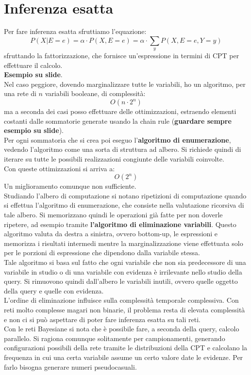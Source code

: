 \message{ !name(modprob.tex)}\documentclass[a4paper,12pt, oneside]{book}
\begin{document}
\section{Inferenza esatta}
Per fare inferenza esatta sfruttiamo l'equazione:
\[P(X|E=e)=\alpha\cdot P(X,E=e)=\alpha\cdot \sum_y P(X,E=e, Y=y)\]
sfruttando la fattorizzazione, che fornisce un'espressione in termini di CPT per
effettuare il calcolo.\\
\textbf{Esempio su slide}.\\
Nel caso peggiore, dovendo marginalizzare tutte le variabili, ho un algoritmo,
per una rete di $n$ variabili booleane, di complessità:
\[O(n\cdot 2^n)\]
ma a seconda dei casi posso effettuare delle ottimizzazioni, estraendo elementi
costanti dalle sommatorie generate usando la chain rule (\textbf{guardare sempre
  esempio su slide}).\\
Per ogni sommatoria che si crea poi eseguo l'\textbf{algoritmo di enumerazione},
vedendo l'algoritmo come una sorta di struttura ad albero. Si richiede quindi di
iterare su tutte le possibili realizzazioni congiunte delle variabili
coinvolte. \\
Con queste ottimizzazioni si arriva a:
\[O(2^n)\]
Un miglioramento comunque non sufficiente.\\
Studiando l'albero di computazione si notano ripetizioni di computazione quando
si effettua l'algoritmo di enumerazione, che consiste nella valutazione
ricorsiva di tale albero. Si memorizzano quindi le operazioni già fatte per non
doverle ripetere, ad esempio tramite \textbf{l'algoritmo di eliminazione
  variabili}. Questo algoritmo valuta da destra a sinistra, ovvero bottom-up, le
espressioni e memorizza i risultati intermedi mentre la marginalizzazione viene
effettuata solo per le porzioni di espressione che dipendono dalla variabile
stessa. \\
Tale algoritmo si basa sul fatto che ogni variabile che non sia predecessore di
una variabile in studio o di una variabile con evidenza è irrilevante nello
studio 
della query. Si rimuovono quindi dall'albero le variabili inutili, ovvero quelle
oggetto della query e quelle con evidenza. \\
L'ordine di eliminazione influisce sulla complessità temporale complessiva. Con
reti molto complesse magari non binarie, il problema resta di elevata
complessità e non ci si può aspettare di poter fare inferenza esatta su tali
reti. \\
Con le reti Bayesiane si nota che è possibile fare, a seconda della query,
calcolo parallelo. Si ragiona comunque solitamente per campionamenti, generando
configurazioni possibili della rete tramite le distribuzioni della CPT e
calcolano la frequenza in cui una certa variabile assume un certo valore date le
evidenze. Per farlo bisogna generare numeri pseudocasuali.
\end{document}
